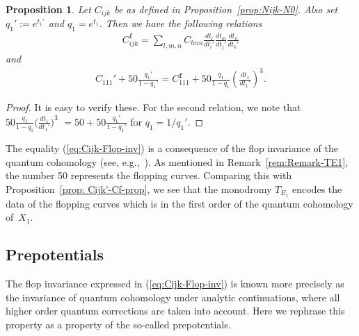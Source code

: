\documentclass[10pt,a4paper]{amsart}
\numberwithin{equation}{section}
\newtheorem{Proposition}[Theorem]{Proposition}
\begin{document}
\begin{Proposition}\label{prop:Yukawa-Reye}Let $C_{ijk}$ be as defined in Proposition~{\rm \ref{prop:Nijk-N0}}. Also set $q_{1}':=e^{t_{1}'}$ and $q_{1}=e^{t_{1}}$. Then we have the following relations
\begin{gather*}
C_{ijk}^{\mathtt{f}}=\sum_{l,m,n}C_{lmn}\frac{dt_{l}}{dt_{i}'}\frac{dt_{m}}{dt_{j}'}\frac{dt_{n}}{dt_{k}'}
\end{gather*}
and
\begin{gather}
C_{111}'+50\frac{q_{1}'}{1-q_{1}'}=C_{111}^{\mathtt{f}}+50\frac{q_{1}}{1-q_{1}}\left(\frac{dt_{1}}{dt_{1}'}\right)^{3}.\label{eq:Cijk-Flop-inv}
\end{gather}
\end{Proposition}
\begin{proof}It is easy to verify these. For the second relation, we note that $50\frac{q_{1}}{1-q_{1}}\big(\frac{dt_{1}}{dt_{1}'}\big)^{3}$
$=50+50\frac{q_{1}'}{1-q_{1}'}$ for $q_{1}=1/q_{1}'$.
\end{proof}

The equality (\ref{eq:Cijk-Flop-inv}) is a consequence of the flop invariance of the quantum cohomology (see, e.g.,~\cite{Iri,IriXia, LLWang}). As mentioned in Remark~\ref{rem:Remark-TE1}, the number 50 represents the flopping curves. Comparing this with Proposition~\ref{prop: Cijk'-Cf-prop}, we see that the monodromy $T_{E_{1}}$ encodes the data of the flopping curves which is in the first order of the quantum cohomology of~$X_{1}$.

\subsection{Prepotentials}

The flop invariance expressed in (\ref{eq:Cijk-Flop-inv}) is known more precisely as the invariance of quantum cohomology under analytic continuations, where all higher order quantum corrections are taken into account. Here we rephrase this property as a property of the so-called prepotentials.
\end{document}
